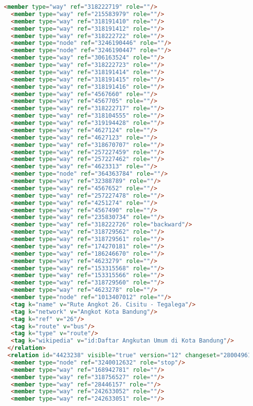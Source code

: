 \begin{lstlisting}[language=HTML,basicstyle=\tiny,caption=bandung1.xml]
  <member type="way" ref="318222719" role=""/>
  <member type="way" ref="215583979" role=""/>
  <member type="way" ref="318191410" role=""/>
  <member type="way" ref="318191412" role=""/>
  <member type="way" ref="318222722" role=""/>
  <member type="node" ref="3246190446" role=""/>
  <member type="node" ref="3246190447" role=""/>
  <member type="way" ref="306163524" role=""/>
  <member type="way" ref="318222723" role=""/>
  <member type="way" ref="318191414" role=""/>
  <member type="way" ref="318191415" role=""/>
  <member type="way" ref="318191416" role=""/>
  <member type="way" ref="4567660" role=""/>
  <member type="way" ref="4567705" role=""/>
  <member type="way" ref="318222717" role=""/>
  <member type="way" ref="318104555" role=""/>
  <member type="way" ref="319194428" role=""/>
  <member type="way" ref="4627124" role=""/>
  <member type="way" ref="4627123" role=""/>
  <member type="way" ref="318670707" role=""/>
  <member type="way" ref="257227459" role=""/>
  <member type="way" ref="257227462" role=""/>
  <member type="way" ref="4623313" role=""/>
  <member type="node" ref="364363784" role=""/>
  <member type="way" ref="32388789" role=""/>
  <member type="way" ref="4567652" role=""/>
  <member type="way" ref="257227478" role=""/>
  <member type="way" ref="4251274" role=""/>
  <member type="way" ref="4567490" role=""/>
  <member type="way" ref="235830734" role=""/>
  <member type="way" ref="318222726" role="backward"/>
  <member type="way" ref="318729562" role=""/>
  <member type="way" ref="318729561" role=""/>
  <member type="way" ref="174270181" role=""/>
  <member type="way" ref="186246670" role=""/>
  <member type="way" ref="4623279" role=""/>
  <member type="way" ref="153315568" role=""/>
  <member type="way" ref="153315566" role=""/>
  <member type="way" ref="318729560" role=""/>
  <member type="way" ref="4623278" role=""/>
  <member type="node" ref="1013407012" role=""/>
  <tag k="name" v="Rute Angkot 26. Cisitu - Tegalega"/>
  <tag k="network" v="Angkot Kota Bandung"/>
  <tag k="ref" v="26"/>
  <tag k="route" v="bus"/>
  <tag k="type" v="route"/>
  <tag k="wikipedia" v="id:Daftar Angkutan Umum di Kota Bandung"/>
 </relation>
 <relation id="4423238" visible="true" version="12" changeset="28004961" timestamp="2015-01-08T20:02:58Z" user="isonpurba" uid="2552445">
  <member type="node" ref="3240012632" role="stop"/>
  <member type="way" ref="168942781" role=""/>
  <member type="way" ref="318756527" role=""/>
  <member type="way" ref="28446157" role=""/>
  <member type="way" ref="242633052" role=""/>
  <member type="way" ref="242633051" role=""/>

\end{lstlisting}
